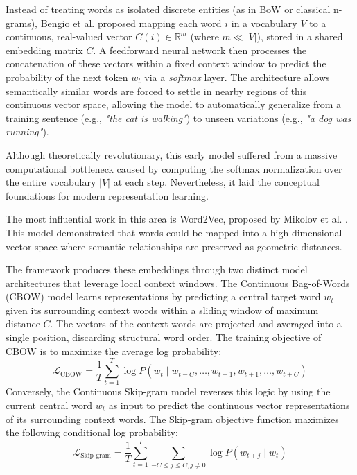 Instead of treating words as isolated discrete entities (as in BoW or classical n-grams), Bengio et al. \cite{bengio2003neural} proposed mapping each word $i$ in a vocabulary $V$ to a continuous, real-valued vector $C(i) \in \mathbb{R}^m$ (where $m \ll |V|$), stored in a shared embedding matrix $C$. A feedforward neural network then processes the concatenation of these vectors within a fixed context window to predict the probability of the next token $w_t$ via a \textit{softmax} layer.
The architecture allows semantically similar words are forced to settle in nearby regions of this continuous vector space, allowing the model to automatically generalize from a training sentence (e.g., \textit{"the cat is walking"}) to unseen variations (e.g., \textit{"a dog was running"}). 

Although theoretically revolutionary, this early model suffered from a massive computational bottleneck caused by computing the softmax normalization over the entire vocabulary $|V|$ at each step. Nevertheless, it laid the conceptual foundations for modern representation learning.



The most influential work in this area is Word2Vec, proposed by Mikolov et al. \cite{mikolov2013efficient}. This model demonstrated that words could be mapped into a high-dimensional vector space where semantic relationships are preserved as geometric distances.

The framework produces these embeddings through two distinct model architectures that leverage local context windows. The Continuous Bag-of-Words (CBOW) model learns representations by predicting a central target word $w_t$ given its surrounding context words within a sliding window of maximum distance $C$. The vectors of the context words are projected and averaged into a single position, discarding structural word order. The training objective of CBOW is to maximize the average log probability:
\begin{equation}
    \mathcal{L}_{\text{CBOW}} = \frac{1}{T} \sum_{t=1}^{T} \log P(w_t \mid w_{t-C}, \dots, w_{t-1}, w_{t+1}, \dots, w_{t+C})
\end{equation}
Conversely, the Continuous Skip-gram model reverses this logic by using the current central word $w_t$ as input to predict the continuous vector representations of its surrounding context words.  The Skip-gram objective function maximizes the following conditional log probability:
\begin{equation}
    \mathcal{L}_{\text{Skip-gram}} = \frac{1}{T} \sum_{t=1}^{T} \sum_{-C \le j \le C, j \neq 0} \log P(w_{t+j} \mid w_t)
\end{equation}


